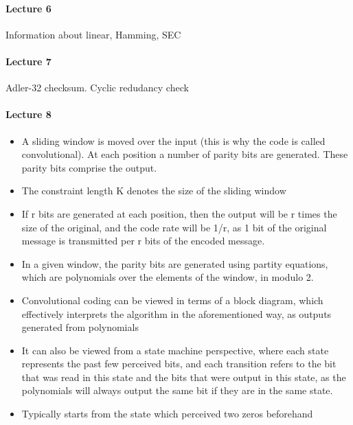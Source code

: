 \documentclass{article}
\begin{document}
\paragraph{Lecture 6}

Information about linear, Hamming, SEC

\paragraph{Lecture 7}

Adler-32 checksum. Cyclic redudancy check

\paragraph{Lecture 8}

\begin{itemize}
\item A sliding window is moved over the input (this is why the code is called convolutional). At each position a number of parity bits are generated. These parity bits comprise the output.

\item The constraint length K denotes the size of the sliding window

\item If r bits are generated at each position, then the output will be r times
the size of the original, and the code rate will be 1/r, as 1 bit of the
original message is transmitted per r bits of the encoded message.

\item In a given window, the parity bits are generated using partity equations,
which are polynomials over the elements of the window, in modulo 2.

\item Convolutional coding can be viewed in terms of a block diagram, which
effectively interprets the algorithm in the aforementioned way, as outputs
generated from polynomials

\item It can also be viewed from a state machine perspective, where each state
represents the past few perceived bits, and each transition refers to the
bit that was read in this state and the bits that were output in this
state, as the polynomials will always output the same bit if they are in
the same state.

\item Typically starts from the state which perceived two zeros beforehand


\end{itemize}
\end{document}
